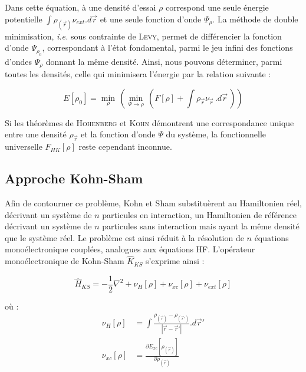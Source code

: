 \documentclass[12pt,a4paper]{book}
\begin{document}
	Dans cette équation, à une densité d'essai $\rho$ correspond une seule énergie potentielle $\int \rho_{(\vec{r})} \nu_{ext} .d\vec{r}$ et une seule fonction d'onde $\Psi_{\rho}$. La méthode de double minimisation, \textit{i.e.} sous contrainte de \textsc{Levy}, permet de différencier la fonction d'onde $\Psi_{\rho_{0}}$, correspondant à l'état fondamental, parmi le jeu infini des fonctions d'ondes $\Psi_{\rho}$ donnant la même densité. Ainsi, nous pouvons déterminer, parmi toutes les densités, celle qui minimisera l'énergie par la relation suivante :
	
	\begin{equation}
	E[\rho_{0}] = \min\limits_{\rho}\, (\min\limits_{\Psi\rightarrow\rho}\, (F[\rho] + \int \rho_{\vec{r}} \nu_{\vec{r}}\, .d\vec{r}\, ))
	\end{equation}
	
	Si les théorèmes de \textsc{Hohenberg} et \textsc{Kohn} démontrent une correspondance unique entre une densité $\rho_{\vec{r}}$ et la fonction d'onde $\Psi$ du système, la fonctionnelle universelle $F_{HK}[\rho]$ reste cependant inconnue.
	
	\subsection{Approche Kohn-Sham}\label{Kohn-Sham}
	
	Afin de contourner ce problème, Kohn et Sham substituèrent au Hamiltonien réel, décrivant un système de $n$ particules en interaction, un Hamiltonien de référence décrivant un système de $n$ particules sans interaction mais ayant la même densité que le système réel. Le problème est ainsi réduit à la résolution de $n$ équations monoélectronique couplées, analogues aux équations HF. L'opérateur monoélectronique de Kohn-Sham $\hat{K}_{KS}$ s'exprime ainsi :
	
	\begin{equation}
	\hat{H}_{KS} = -\frac{1}{2} \nabla^{2} + \nu_{H}[\rho] + \nu_{xc}[\rho] + \nu_{ext}[\rho]
	\end{equation}
	
	\noindent où :
	\begin{align}
	\nu_{H}[\rho] &= \int \frac{\rho_{(\vec{r})} - \rho_{(\vec{r}')}}{|\vec{r} - \vec{r}'|} .d\vec{r}' \\
	\nu_{xc}[\rho] &= \frac{\partial E_{xc}[\rho_{(\vec{r})}]}{\partial\rho_{(\vec{r})}}
	\end{align}
	
\end{document}
